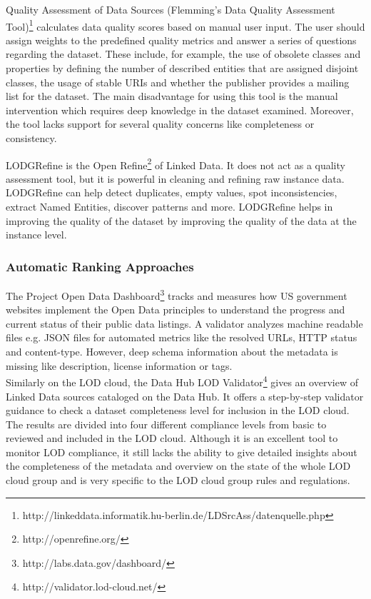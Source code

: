 \documentclass[onecolumn, crcready]{iosart2c}
\begin{document}
Quality Assessment of Data Sources (Flemming's Data Quality Assessment Tool)\footnote{http://linkeddata.informatik.hu-berlin.de/LDSrcAss/datenquelle.php} calculates data quality scores based on manual user input. The user should assign weights to the predefined quality metrics and answer a series of questions regarding the dataset. These include, for example, the use of obsolete classes and properties by defining the number of described entities that are assigned disjoint classes, the usage of stable URIs and whether the publisher provides a mailing list for the dataset. The main disadvantage for using this tool is the manual intervention which requires deep knowledge in the dataset examined. Moreover, the tool lacks support for several quality concerns like completeness or consistency.

LODGRefine \cite{conf/i-semantics/Verlic12} is the Open Refine\footnote{http://openrefine.org/} of Linked Data. It does not act as a quality assessment tool, but it is powerful in cleaning and refining raw instance data. LODGRefine can help detect duplicates, empty values, spot inconsistencies, extract Named Entities, discover patterns and more. LODGRefine helps in improving the quality of the dataset by improving the quality of the data at the instance level.\\

\subsubsection{Automatic Ranking Approaches}

The Project Open Data Dashboard\footnote{http://labs.data.gov/dashboard/} tracks and measures how US government websites implement the Open Data principles to understand the progress and current status of their public data listings. A validator analyzes machine readable files e.g. JSON files for automated metrics like the resolved URLs, HTTP status and content-type. However, deep schema information about the metadata is missing like description, license information or tags. \\
Similarly on the LOD cloud, the Data Hub LOD Validator\footnote{http://validator.lod-cloud.net/} gives an overview of Linked Data sources cataloged on the Data Hub. It offers a step-by-step validator guidance to check a dataset completeness level for inclusion in the LOD cloud. The results are divided into four different compliance levels from basic to reviewed and included in the LOD cloud. Although it is an excellent tool to monitor LOD compliance, it still lacks the ability to give detailed insights about the completeness of the metadata and overview on the state of the whole LOD cloud group and is very specific to the LOD cloud group rules and regulations.\\
\end{document}
